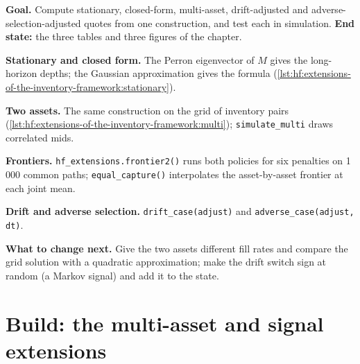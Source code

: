 \begin{tutorial}
\textbf{Goal.} Compute stationary, closed-form, multi-asset, drift-adjusted and adverse-selection-adjusted quotes from one construction, and test
each in simulation. \textbf{End state:} the three tables and three figures of the chapter.
\begin{tutsteps}
\item \textbf{Stationary and closed form.} The Perron eigenvector of $M$ gives the long-horizon depths; the Gaussian approximation gives the
formula (\cref{lst:hf:extensions-of-the-inventory-framework:stationary}).
\label{lst:hf:extensions-of-the-inventory-framework:stationary}
\item \textbf{Two assets.} The same construction on the grid of inventory pairs
(\cref{lst:hf:extensions-of-the-inventory-framework:multi}); \texttt{simulate\_multi} draws correlated mids.
\label{lst:hf:extensions-of-the-inventory-framework:multi}
\item \textbf{Frontiers.} \texttt{hf\_extensions.frontier2()} runs both policies for six penalties on 1\,000 common paths;
\texttt{equal\_capture()} interpolates the asset-by-asset frontier at each joint mean.
\item \textbf{Drift and adverse selection.} \texttt{drift\_case(adjust)} and \texttt{adverse\_case(adjust, dt)}.
\end{tutsteps}
\textbf{What to change next.} Give the two assets different fill rates and compare the grid solution with a quadratic approximation; make the drift
switch sign at random (a Markov signal) and add it to the state.
\end{tutorial}

\section{Build: the multi-asset and signal extensions}\label{bld:hf:extensions-of-the-inventory-framework:multimm}


